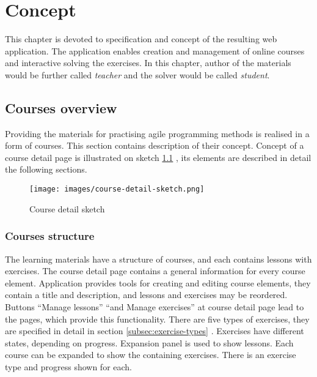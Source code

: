 \chapter[Concept]{Concept}
\label{ch:concept}
This chapter is devoted to specification and concept of the resulting web application. The application enables creation and management of online courses and interactive solving the exercises. In this chapter, author of the materials would be further called \textit{teacher} and the solver would be called \textit{student}.

    \section{Courses overview}
    \label{sec:exercises}
    Providing the materials for practising agile programming methods is realised in a form of courses. This section contains description of their concept. Concept of a course detail page is illustrated on sketch \ref{fig:course-detail-sketch} , its elements are described in detail the following sections.
        
        \begin{figure}[h]
            \centerline{
                \texttt{[image: images/course-detail-sketch.png]}}
            \caption{Course detail sketch}
            \label{fig:course-detail-sketch}
        \end{figure}
        
        \subsection{Courses structure}
        The learning materials have a structure of courses, and each contains lessons with exercises. The course detail page contains a general information for every course element. Application provides tools for creating and editing course elements, they contain a title and description, and lessons and exercises may be reordered. Buttons ``Manage lessons'' ``and Manage exercises'' at course detail page lead to the pages, which provide this functionality. There are five types of exercises, they are specified in detail in section \ref{subsec:exercise-types} . Exercises have different states, depending on progress. Expansion panel is used to show lessons. Each course can be expanded to show the containing exercises. There is an exercise type and progress shown for each.
        
